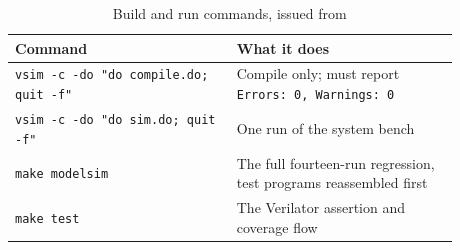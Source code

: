\begin{table}[H]
\centering
\begin{tabular}{@{}L{0.44\linewidth}L{0.44\linewidth}@{}}
\toprule
\textbf{Command} & \textbf{What it does} \\
\midrule
\texttt{vsim -c -do "do compile.do; quit -f"} & Compile only; must report
  \texttt{Errors: 0, Warnings: 0} \\
\texttt{vsim -c -do "do sim.do; quit -f"}     & One run of the system bench \\
\texttt{make modelsim} & The full fourteen-run regression, test programs
  reassembled first \\
\texttt{make test}     & The Verilator assertion and coverage flow \\
\bottomrule
\end{tabular}
\caption{Build and run commands, issued from }
\label{tab:buildcmds}
\end{table}
